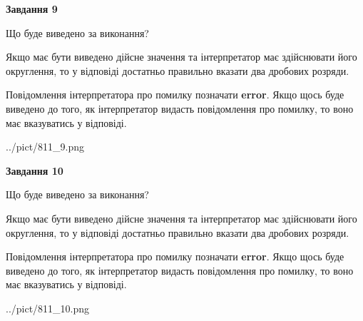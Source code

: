 \documentclass[12pt, ukrainian]{article}
\begin{document}
{\begin {Large}
{\begin {center}\textbf{Завдання 9}\end {center}}\par
Що буде виведено за виконання? \par

Якщо має бути виведено дійсне значення та інтерпретатор має здійснювати його округлення, 
то у відповіді достатньо правильно вказати два дробових розряди.

Повідомлення інтерпретатора про помилку позначати \textbf{error}.
Якщо щось буде виведено до того, як інтерпретатор видасть повідомлення про помилку, 
то воно має вказуватись у відповіді. \par

\begin{center}
	{../pict/811_9.png}
\end{center}
\newpage

{\begin {center}\textbf{Завдання 10}\end {center}}\par
Що буде виведено за виконання? \par

Якщо має бути виведено дійсне значення та інтерпретатор має здійснювати його округлення, 
то у відповіді достатньо правильно вказати два дробових розряди.

Повідомлення інтерпретатора про помилку позначати \textbf{error}.
Якщо щось буде виведено до того, як інтерпретатор видасть повідомлення про помилку, 
то воно має вказуватись у відповіді. \par

\begin{center}
	{../pict/811_10.png}
\end{center}
\newpage

\end {Large}}
\end{document}
